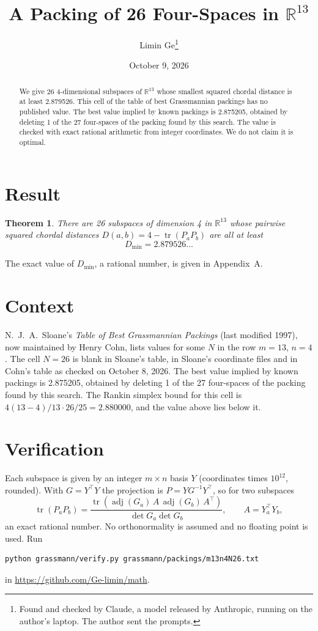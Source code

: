 \documentclass[11pt,a4paper]{article}
\title{A Packing of 26 Four-Spaces in $\mathbb{R}^{13}$}
\author{Limin Ge\thanks{Found and checked by Claude, a model released by Anthropic, running on the author's laptop. The author sent the prompts.}}
\date{October 9, 2026}
\newtheorem*{theorem}{Theorem}
\begin{document}
\maketitle
\begin{abstract}
We give 26 4-dimensional subspaces of $\mathbb{R}^{13}$ whose smallest squared chordal distance is at least 2.879526. This cell of the table of best Grassmannian packings has no published value. The best value implied by known packings is 2.875205, obtained by deleting 1 of the 27 four-spaces of the packing found by this search. The value is checked with exact rational arithmetic from integer coordinates. We do not claim it is optimal.
\end{abstract}

\section{Result}
\begin{theorem}
There are 26 subspaces of dimension 4 in $\mathbb{R}^{13}$ whose pairwise squared chordal distances $D(a,b) = 4 - \operatorname{tr}(P_aP_b)$ are all at least
\[ D_{\min} = 2.879526\ldots \]
\end{theorem}
The exact value of $D_{\min}$, a rational number, is given in Appendix~A.


\section{Context}
N.~J.~A.~Sloane's \emph{Table of Best Grassmannian Packings} (last modified 1997), now maintained by Henry Cohn, lists values for some $N$ in the row $m=13$, $n=4$. The cell $N=26$ is blank in Sloane's table, in Sloane's coordinate files and in Cohn's table as checked on October 8, 2026. The best value implied by known packings is 2.875205, obtained by deleting 1 of the 27 four-spaces of the packing found by this search. The Rankin simplex bound for this cell is $4(13-4)/13\cdot 26/25 = 2.880000$, and the value above lies below it.


\section{Verification}
Each subspace is given by an integer $m\times n$ basis $Y$ (coordinates times $10^{12}$, rounded). With $G=Y^\top Y$ the projection is $P=YG^{-1}Y^\top$, so for two subspaces
\[ \operatorname{tr}(P_aP_b)=\frac{\operatorname{tr}(\operatorname{adj}(G_a)\,A\,\operatorname{adj}(G_b)\,A^\top)}{\det G_a\det G_b},\qquad A=Y_a^\top Y_b, \]
an exact rational number. No orthonormality is assumed and no floating point is used. Run
\begin{verbatim}
python grassmann/verify.py grassmann/packings/m13n4N26.txt
\end{verbatim}
in \url{https://github.com/Ge-limin/math}.
\end{document}
